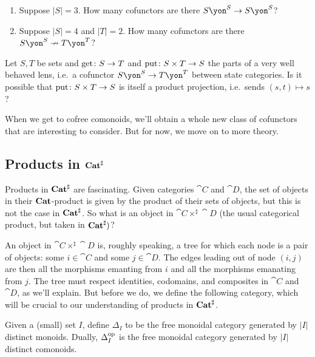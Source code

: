 \documentclass[Book-Poly]{subfiles}
\begin{document}
\begin{exercise}\label{exc.how_many_vwbls}
\begin{enumerate}
	\item Suppose $|S|=3$. How many cofunctors are there $S\yon^S\to S\yon^S$?
	\item Suppose $|S|=4$ and $|T|=2$. How many cofunctors are there $S\yon^S\cof T\yon^T$?
\qedhere
\end{enumerate}
\end{exercise}

\begin{exercise}
Let $S,T$ be sets and $\mathrm{get}\colon S\to T$ and $\mathrm{put}\colon S\times T\to S$ the parts of a very well behaved lens, i.e.\ a cofunctor $S\yon^S\to T\yon^T$ between state categories. Is it possible that $\mathrm{put}\colon S\times T\to S$ is itself a product projection, i.e.\ sends $(s,t)\mapsto s$?
\end{exercise}

When we get to cofree comonoids, we'll obtain a whole new class of cofunctors that are interesting to consider. But for now, we move on to more theory.

\subsection{Products in $\mathbf{Cat}^\sharp$}

Products in $\mathbf{Cat}^\sharp$ are fascinating. Given categories $\cat{C}$ and $\cat{D}$, the set of objects in their $\mathbf{Cat}$-product is given by the product of their sets of objects, but this is not the case in $\mathbf{Cat}^\sharp$. So what is an object in $\cat{C}\times^\sharp\cat{D}$ (the usual categorical product, but taken in $\mathbf{Cat}^\sharp)$? 

An object in $\cat{C}\times^\sharp\cat{D}$ is, roughly speaking, a tree for which each node is a pair of objects: some $i\in\cat{C}$ and some $j\in\cat{D}$.
The edges leading out of node $(i, j)$ are then all the morphisms emanting from $i$ and all the morphisms emanating from $j$.
The tree must respect identities, codomains, and composites in $\cat{C}$ and $\cat{D}$, as we'll explain.
But before we do, we define the following category, which will be crucial to our understanding of products in $\mathbf{Cat}^\sharp$.

\begin{definition} \label{def.free_monoid_cat}
Given a (small) set $I$, define $\Delta_I$ to be the free monoidal category generated by $|I|$ distinct monoids.
Dually, $\Delta_I^{\textnormal{op}}$ is the free monoidal category generated by $|I|$ distinct comonoids.
\end{definition}
\end{document}
